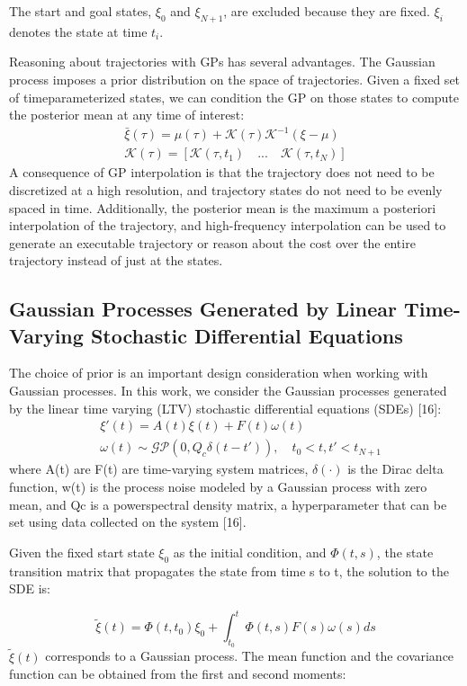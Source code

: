 \documentclass{IEEEtran}
\begin{document}
The start and goal states, $\xi_0$ and $\xi_{N+1}$, are excluded because
they are fixed. $\xi_i$ denotes the state at time $t_i$.

Reasoning about trajectories with GPs has several advantages. The Gaussian process imposes a prior distribution
on the space of trajectories. Given a fixed set of timeparameterized states, we can condition the GP on those states
to compute the posterior mean at any time of interest:
\begin{gather}
\bar{\xi}(\tau)=\mu(\tau)+\mathcal{K}(\tau)\mathcal{K}^{-1}(\xi-\mu)\\
\mathcal{K}(\tau)=[\mathcal{K}(\tau,t_1) \quad... \quad \mathcal{K}(\tau,t_N)]
\end{gather}
A consequence of GP interpolation is that the trajectory does
not need to be discretized at a high resolution, and trajectory
states do not need to be evenly spaced in time. Additionally,
the posterior mean is the maximum a posteriori interpolation
of the trajectory, and high-frequency interpolation can be
used to generate an executable trajectory or reason about the
cost over the entire trajectory instead of just at the states.
\subsection{Gaussian Processes Generated by Linear Time-Varying
Stochastic Differential Equations}
The choice of prior is an important design consideration
when working with Gaussian processes. In this work, we
consider the Gaussian processes generated by the linear time
varying (LTV) stochastic differential equations (SDEs) [16]:
\begin{equation}
\begin{split}
&\xi'(t)=A(t)\xi(t)+F(t)\omega(t)\\
&\omega(t)\sim{\mathcal{GP}(0,{Q_c\delta(t-t')})},\quad t_0<t,t'<t_{N+1}
\end{split}
\end{equation}
where A(t) are F(t) are time-varying system matrices, $\delta(\cdot)$
is the Dirac delta function, w(t) is the process noise modeled
by a Gaussian process with zero mean, and Qc is a powerspectral density matrix, a hyperparameter that can be set
using data collected on the system [16].

Given the fixed start state $\xi_0$ as the initial condition, and
$\Phi(t, s)$, the state transition matrix that propagates the state
from time s to t, the solution to the SDE is:

\begin{equation}
\tilde{\xi}(t)=\Phi(t,{t_0}){\xi_0}+\int_{t_0}^{t}\Phi(t,s)F(s)\omega(s)ds
\end{equation}
$\tilde{\xi}(t)$ corresponds to a Gaussian process. The mean function
and the covariance function can be obtained from the first
and second moments:
\end{document}
